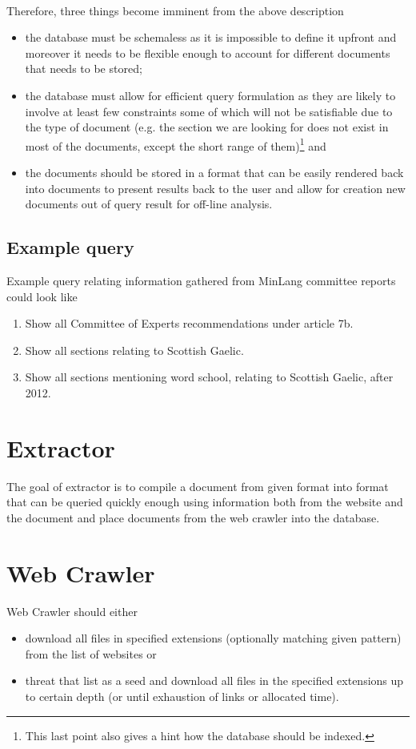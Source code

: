 \documentclass{tufte-book}
\begin{document}
\paragraph{}
Therefore, three things become imminent from the above description
\begin{itemize}
  \item the database must be schemaless as it is impossible to define it upfront and moreover it needs to be flexible enough to account for different documents that needs to be stored;
  \item the database must allow for efficient query formulation as they are likely to involve at least few constraints some of which will not be satisfiable due to the type of document (e.g. the section we are looking for does not exist in most of the documents, except the short range of them)\footnote{This last point also gives a hint how the database should be indexed.} and
  \item the documents should be stored in a format that can be easily rendered back into documents to present results back to the user and allow for creation new documents out of query result for off-line analysis.
\end{itemize}

\subsection{Example query}
Example query relating information gathered from MinLang committee reports could look like
\begin{enumerate}
  \item Show all Committee of Experts recommendations under article 7b.
  \item Show all sections relating to Scottish Gaelic.
  \item Show all sections mentioning word school, relating to Scottish Gaelic, after 2012.
\end{enumerate}

\section{Extractor}
The goal of extractor is to compile a document from given format into format that can be queried quickly enough using information both from the website and the document and place documents from the web crawler into the database.

\section{Web Crawler}
Web Crawler should either
\begin{itemize}
  \item download all files in specified extensions (optionally matching given pattern) from the list of websites or
  \item threat that list as a seed and download all files in the specified extensions up to certain depth (or until exhaustion of links or allocated time).
\end{itemize}
\end{document}
